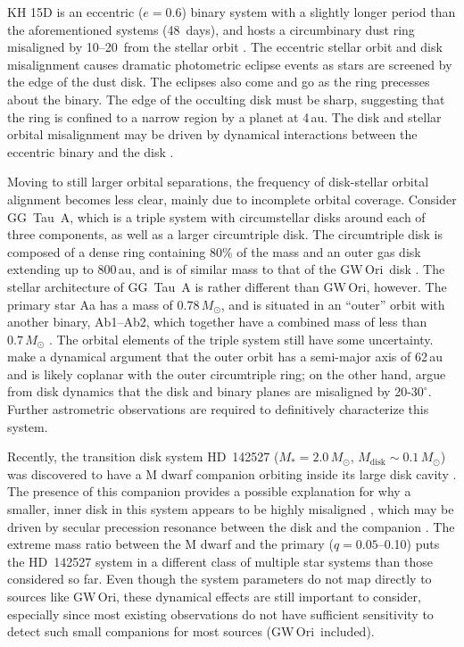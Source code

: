 \documentclass[twocolumn]{aastex61}
\newcommand{\obj}{GW\,Ori}
\begin{document}
KH 15D is an eccentric ($e=0.6$) binary system with a slightly longer period than the aforementioned systems (\mbox{48 days}), and hosts a circumbinary dust ring misaligned by 10--20\degr\ from the stellar orbit \citep{chiang04,capelo12}. The eccentric stellar orbit and disk misalignment causes dramatic photometric eclipse events as stars are screened by the edge of the dust disk. The eclipses also come and go as the ring precesses about the binary. The edge of the occulting disk must be sharp, suggesting that the ring is confined to a narrow region by a planet at 4\,au. The disk and stellar orbital misalignment may be driven by dynamical interactions between the eccentric binary and the disk \citep[e.g.,][]{martin17,zanazzi17}.

Moving to still larger orbital separations, the frequency of disk-stellar orbital alignment becomes less clear, mainly due to incomplete orbital coverage. Consider GG~Tau~A, which is a triple system with circumstellar disks around each of three components, as well as a larger circumtriple disk. The circumtriple disk is composed of a dense ring containing 80\% of the mass and an outer gas disk extending up to 800\,au, and is of similar mass to that of the \obj\ disk \citep[$0.12\,M_\odot$;][]{guilloteau99}. The stellar architecture of GG~Tau~A is rather different than \obj, however. The primary star Aa has a mass of $0.78\,M_\odot$, and is situated in an ``outer'' orbit with another binary, Ab1--Ab2, which together have a combined mass of less than $0.7\,M_\odot$ \citep{dutrey16}. The orbital elements of the triple system still have some uncertainty. \citet{nelson16} make a dynamical argument that the outer orbit has a semi-major axis of 62\,au and is likely coplanar with the outer circumtriple ring; on the other hand, \citet{cazzoletti17} argue from disk dynamics that the disk and binary planes are misaligned by 20-$30^\circ$. Further astrometric observations are required to definitively characterize this system.

Recently, the transition disk system HD~142527 ($M_\ast = 2.0\,M_\odot$, $M_\mathrm{disk} \sim 0.1\,M_\odot$) was discovered to have a M dwarf companion orbiting inside its large disk cavity \citep{biller12,lacour16}. The presence of this companion provides a possible explanation for why a smaller, inner disk in this system appears to be highly misaligned \citep[$\sim$70\degr;][]{avenhaus14,marino15}, which may be driven by secular precession resonance between the disk and the companion \citep{owen17}.
The extreme mass ratio between the M dwarf and the primary ($q = 0.05$--0.10) puts the HD~142527 system in a different class of multiple star systems than those considered so far. Even though the system parameters do not map directly to sources like \obj, these dynamical effects are still important to consider, especially since most existing observations do not have sufficient sensitivity to detect such small companions for most sources (\obj\ included).
\end{document}

